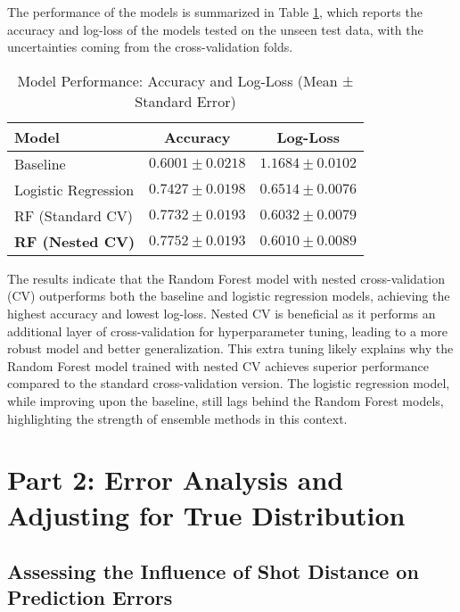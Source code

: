 \documentclass[fleqn,moreauthors,10pt]{ds_report}
\begin{document}
The performance of the models is summarized in Table \ref{tab:model_performance}, which reports the accuracy and log-loss of the models tested on the unseen test data, with the uncertainties coming from the cross-validation folds.

\begin{table}[h]
\centering
\caption{Model Performance: Accuracy and Log-Loss (Mean ± Standard Error)}
\begin{tabular}{|l|c|c|}
\hline
\textbf{Model} & \textbf{Accuracy} & \textbf{Log-Loss} \\ \hline
Baseline & \( 0.6001 \pm 0.0218 \) & \( 1.1684 \pm 0.0102 \) \\ \hline
Logistic Regression & \( 0.7427 \pm 0.0198 \) & \( 0.6514 \pm 0.0076 \) \\ \hline
RF (Standard CV) & \( 0.7732 \pm 0.0193 \) & \( 0.6032 \pm 0.0079 \) \\ \hline
\textbf{RF (Nested CV)} & \( \mathbf{0.7752 \pm 0.0193} \) & \( \mathbf{0.6010 \pm 0.0089} \) \\ \hline
\end{tabular}
\label{tab:model_performance}
\end{table}

The results indicate that the Random Forest model with nested cross-validation (CV) outperforms both the baseline and logistic regression models, achieving the highest accuracy and lowest log-loss. Nested CV is beneficial as it performs an additional layer of cross-validation for hyperparameter tuning, leading to a more robust model and better generalization. This extra tuning likely explains why the Random Forest model trained with nested CV achieves superior performance compared to the standard cross-validation version. The logistic regression model, while improving upon the baseline, still lags behind the Random Forest models, highlighting the strength of ensemble methods in this context.


\section*{Part 2: Error Analysis and Adjusting for True Distribution}

\subsection*{Assessing the Influence of Shot Distance on Prediction Errors}
\end{document}
